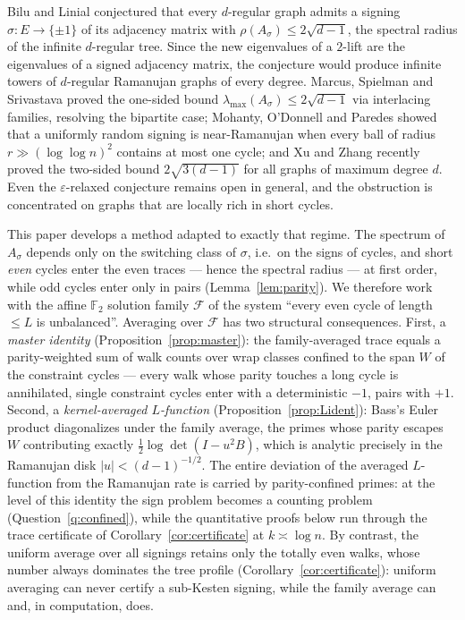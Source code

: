 \documentclass[11pt]{article}
\theoremstyle{remark}
\begin{document}
Bilu and Linial \cite{bilulinial06} conjectured that every $d$-regular
graph admits a signing $\sigma\colon E\to\{\pm1\}$ of its adjacency
matrix with $\rho(A_\sigma)\le2\sqrt{d-1}$, the spectral radius of the
infinite $d$-regular tree. Since the new eigenvalues of a $2$-lift are
the eigenvalues of a signed adjacency matrix, the conjecture would
produce infinite towers of $d$-regular Ramanujan graphs of every
degree. Marcus, Spielman and Srivastava \cite{mss15} proved the
one-sided bound $\lambda_{\max}(A_\sigma)\le2\sqrt{d-1}$ via
interlacing families, resolving the bipartite case; Mohanty, O'Donnell
and Paredes \cite{mop20} showed that a uniformly random signing is
near-Ramanujan when every ball of radius $r\gg(\log\log n)^2$ contains
at most one cycle; and Xu and Zhang \cite{xuzhang26} recently proved
the two-sided bound $2\sqrt{3(d-1)}$ for all graphs of maximum degree
$d$. Even the $\varepsilon$-relaxed conjecture remains open in
general, and the obstruction is concentrated on graphs that are
locally rich in short cycles.

This paper develops a method adapted to exactly that regime. The
spectrum of $A_\sigma$ depends only on the switching class of
$\sigma$, i.e.\ on the signs of cycles, and short \emph{even} cycles
enter the even traces --- hence the spectral radius --- at first
order, while odd cycles enter only in pairs
(Lemma~\ref{lem:parity}). We therefore work with the affine
$\mathbb F_2$ solution family $\mathcal F$ of the system ``every even
cycle of length $\le L$ is unbalanced''. Averaging over $\mathcal F$
has two structural consequences. First, a \emph{master identity}
(Proposition~\ref{prop:master}): the family-averaged trace equals a
parity-weighted sum of walk counts over wrap classes confined to the
span $W$ of the constraint cycles --- every walk whose parity touches
a long cycle is annihilated, single constraint cycles enter with a
deterministic $-1$, pairs with $+1$. Second, a \emph{kernel-averaged
$L$-function} (Proposition~\ref{prop:Lident}): Bass's Euler product
diagonalizes under the family average, the primes whose parity escapes
$W$ contributing exactly $\tfrac12\log\det(I-u^2B)$, which is analytic
precisely in the Ramanujan disk $|u|<(d-1)^{-1/2}$. The entire
deviation of the averaged $L$-function from the Ramanujan rate is
carried by parity-confined primes: at the level of this identity the
sign problem becomes a counting problem (Question~\ref{q:confined}),
while the quantitative proofs below run through the trace certificate
of Corollary~\ref{cor:certificate} at $k\asymp\log n$. By contrast, the
uniform average over all signings retains only the totally even
walks, whose number always dominates the tree profile
(Corollary~\ref{cor:certificate}): uniform averaging can never certify
a sub-Kesten signing, while the family average can and, in
computation, does.
\end{document}
